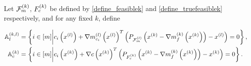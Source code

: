 
Let ${\mathcal F_m^{(k)}}$, ${F_c^{(k)}}$ be defined by \cref{define_feasiblek} and \cref{define_truefeasiblek} respectively, 
and for any fixed $k$, define

\begin{align}
{\mathbb A_l^{(k, l)}} &= \left\{ i \in [m] \bigg | c_i\left({x^{(l)}}\right) + {\nabla m_{c_i}^{(l)}\left({x^{(l)}}\right)}^T\left( P_{{\mathcal F_m^{(l)}}}\left(x^{(k)} - {\nabla m_f^{(k)}\left(x^{(k)}\right)}\right) - {x^{(l)}}\right) = 0\right\}, \label{tbbt_a2} \\
{\mathbb A_c^{(k)}} &= \left\{ i \in [m] \bigg | c_i\left(x^{(k)}\right) + \nabla c\left(x^{(k)}\right)^T\left( P_{{F_c^{(k)}}}\left(x^{(k)} - {\nabla m_f^{(k)}\left(x^{(k)}\right)}\right) - x^{(k)}\right) = 0\right\}. \label{tbbt_a3}
\end{align}

